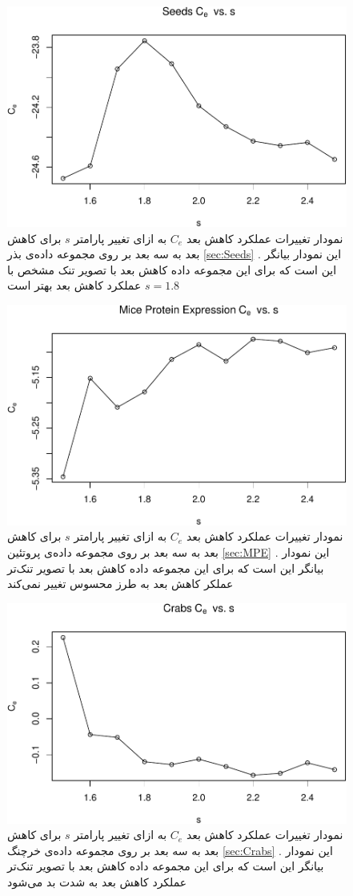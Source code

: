 \begin{figure}[H]
\centering
\includegraphics[width=0.7\linewidth]{Report_files/figure-latex/unnamed-chunk-26-5}
\caption{
نمودار تغییرات عملکرد کاهش بعد 
$C_e$
به ازای تغییر پارامتر
$s$
برای کاهش بعد به 
سه بعد بر روی مجموعه داده‌‌‌ی 
بذر
\ref{sec:Seeds}
. این نمودار بیانگر این است که برای این مجموعه داده کاهش بعد 
با تصویر تنک‌ مشخص با 
$s=1.8$
 عملکرد کاهش بعد بهتر است
}
\end{figure}

\begin{figure}[H]
\centering
\includegraphics[width=0.7\linewidth]{Report_files/figure-latex/unnamed-chunk-26-6}
\caption{
نمودار تغییرات عملکرد کاهش بعد 
$C_e$
به ازای تغییر پارامتر
$s$
برای کاهش بعد به 
سه بعد بر روی مجموعه داده‌‌‌ی 
پروتئین
\ref{sec:MPE}
. این نمودار بیانگر این است که برای این مجموعه داده کاهش بعد 
با تصویر تنک‌تر عملکر کاهش بعد به طرز محسوس تغییر نمی‌کند
}
\end{figure}

\begin{figure}[H]
\centering
\includegraphics[width=0.7\linewidth]{Report_files/figure-latex/unnamed-chunk-26-7}
\caption{
نمودار تغییرات عملکرد کاهش بعد 
$C_e$
به ازای تغییر پارامتر
$s$
برای کاهش بعد به 
سه بعد بر روی مجموعه داده‌‌‌ی 
خرچنگ
\ref{sec:Crabs}
. این نمودار بیانگر این است که برای این مجموعه داده کاهش بعد 
با تصویر تنک‌تر عملکرد کاهش بعد به شدت بد می‌شود
}
\end{figure}



